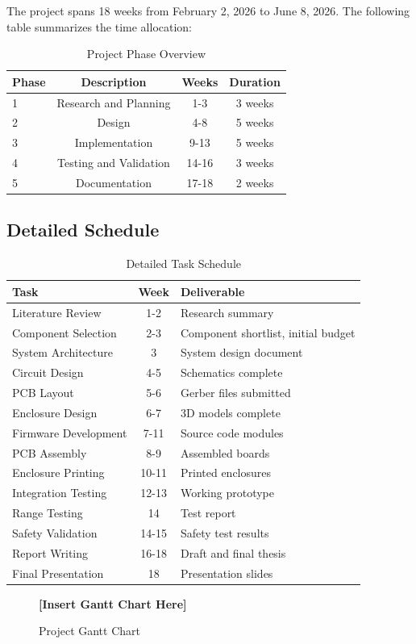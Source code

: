 The project spans 18 weeks from February 2, 2026 to June 8, 2026. The following table summarizes the time allocation:

\begin{table}[h]
\centering
\begin{tabular}{|l|c|c|c|}
\hline
\textbf{Phase} & \textbf{Description} & \textbf{Weeks} & \textbf{Duration} \\
\hline
1 & Research and Planning & 1-3 & 3 weeks \\
\hline
2 & Design & 4-8 & 5 weeks \\
\hline
3 & Implementation & 9-13 & 5 weeks \\
\hline
4 & Testing and Validation & 14-16 & 3 weeks \\
\hline
5 & Documentation & 17-18 & 2 weeks \\
\hline
\end{tabular}
\caption{Project Phase Overview}
\end{table}

\subsection*{Detailed Schedule}

\begin{table}[h]
\centering
\begin{tabular}{|l|c|l|}
\hline
\textbf{Task} & \textbf{Week} & \textbf{Deliverable} \\
\hline
Literature Review & 1-2 & Research summary \\
\hline
Component Selection & 2-3 & Component shortlist, initial budget \\
\hline
System Architecture & 3 & System design document \\
\hline
Circuit Design & 4-5 & Schematics complete \\
\hline
PCB Layout & 5-6 & Gerber files submitted \\
\hline
Enclosure Design & 6-7 & 3D models complete \\
\hline
Firmware Development & 7-11 & Source code modules \\
\hline
PCB Assembly & 8-9 & Assembled boards \\
\hline
Enclosure Printing & 10-11 & Printed enclosures \\
\hline
Integration Testing & 12-13 & Working prototype \\
\hline
Range Testing & 14 & Test report \\
\hline
Safety Validation & 14-15 & Safety test results \\
\hline
Report Writing & 16-18 & Draft and final thesis \\
\hline
Final Presentation & 18 & Presentation slides \\
\hline
\end{tabular}
\caption{Detailed Task Schedule}
\end{table}

\begin{figure}[h]
\centering
\textbf{[Insert Gantt Chart Here]}
\caption{Project Gantt Chart}
\end{figure}
